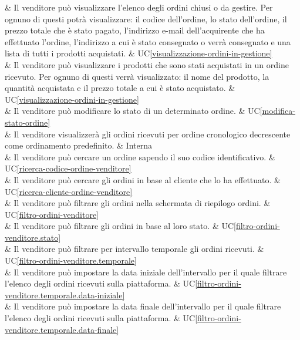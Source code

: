  & Il venditore può visualizzare l'elenco degli ordini chiusi o da gestire. Per ognuno di questi potrà visualizzare: il codice dell'ordine, lo stato dell'ordine, il prezzo totale che è stato pagato, l'indirizzo e-mail dell'acquirente che ha effettuato l'ordine, l'indirizzo a cui è stato consegnato o verrà consegnato e una lista di tutti i prodotti acquistati. & UC\ref{visualizzazione-ordini-in-gestione} \\

 & Il venditore può visualizzare i prodotti che sono stati acquistati in un ordine ricevuto. Per ognuno di questi verrà visualizzato: il nome del prodotto, la quantità acquistata e il prezzo totale a cui è stato acquistato. & UC\ref{visualizzazione-ordini-in-gestione} \\

 & Il venditore può modificare lo stato di un determinato ordine. & UC\ref{modifica-stato-ordine} \\

 & Il venditore visualizzerà gli ordini ricevuti per ordine cronologico decrescente come ordinamento predefinito. & Interna \\

 & Il venditore può cercare un ordine sapendo il suo codice identificativo. & UC\ref{ricerca-codice-ordine-venditore} \\
     
 & Il venditore può cercare gli ordini in base al cliente che lo ha effettuato. & UC\ref{ricerca-cliente-ordine-venditore} \\
    
 & Il venditore può filtrare gli ordini nella schermata di riepilogo ordini. & UC\ref{filtro-ordini-venditore} \\
    
 & Il venditore può filtrare gli ordini in base al loro stato. & UC\ref{filtro-ordini-venditore.stato} \\
    
 & Il venditore può filtrare per intervallo temporale gli ordini ricevuti. & UC\ref{filtro-ordini-venditore.temporale} \\
    
 & Il venditore può impostare la data iniziale dell'intervallo per il quale filtrare l'elenco degli ordini ricevuti sulla piattaforma. & UC\ref{filtro-ordini-venditore.temporale.data-iniziale} \\
    
 & Il venditore può impostare la data finale dell'intervallo per il quale filtrare l'elenco degli ordini ricevuti sulla piattaforma. & UC\ref{filtro-ordini-venditore.temporale.data-finale} \\
